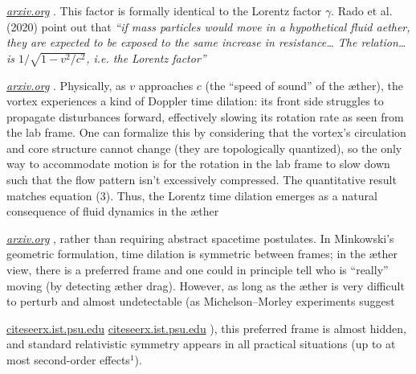 \documentclass[aps,preprint,superscriptaddress]{revtex4}
\begin{document}
\href{https://arxiv.org/pdf/2012.07395#:~:text=which%20contains%20the%20familiar%20Lorentz,the%20Lorentz%20factor}{\textit{arxiv.org}}
. This factor is formally identical to the Lorentz factor $\gamma$. Rado et al. (2020) point out that \textit{“if mass particles would move in a hypothetical fluid aether, they are expected to be exposed to the same increase in resistance… The relation… is $1/\sqrt{1-v^2/c^2}$, i.e. the Lorentz factor”}

\href{https://arxiv.org/pdf/2012.07395#:~:text=which%20contains%20the%20familiar%20Lorentz,the%20Lorentz%20factor}{\textit{arxiv.org}}
. Physically, as $v$ approaches $c$ (the “speed of sound” of the æther), the vortex experiences a kind of Doppler time dilation: its front side struggles to propagate disturbances forward, effectively slowing its rotation rate as seen from the lab frame. One can formalize this by considering that the vortex’s circulation and core structure cannot change (they are topologically quantized), so the only way to accommodate motion is for the rotation in the lab frame to slow down such that the flow pattern isn’t excessively compressed. The quantitative result matches equation (3). Thus, the Lorentz time dilation emerges as a natural consequence of fluid dynamics in the æther

\href{https://arxiv.org/pdf/2012.07395#:~:text=So%2C%20if%20mass%20particles%20would,If%20anything%2C%20there%20would%20have}{\textit{arxiv.org}}
, rather than requiring abstract spacetime postulates. In Minkowski’s geometric formulation, time dilation is symmetric between frames; in the æther view, there is a preferred frame and one could in principle tell who is “really” moving (by detecting æther drag). However, as long as the æther is very difficult to perturb and almost undetectable (as Michelson–Morley experiments suggest

\href{https://citeseerx.ist.psu.edu/document?repid=rep1&type=pdf&doi=25483f1ebc9dc442a9f1505a49d96eb35e92e3f4#:~:text=21,ph%2F0205379%20%28Oct%202002}{citeseerx.ist.psu.edu}
\href{https://citeseerx.ist.psu.edu/document?repid=rep1&type=pdf&doi=25483f1ebc9dc442a9f1505a49d96eb35e92e3f4#:~:text=22.%20Munera%2C%20H.%2C%20%E2%80%9CMichelson,938.%20Also%20published%20at}{citeseerx.ist.psu.edu}
), this preferred frame is almost hidden, and standard relativistic symmetry appears in all practical situations (up to at most second-order effects${}^{1}$).
\end{document}
